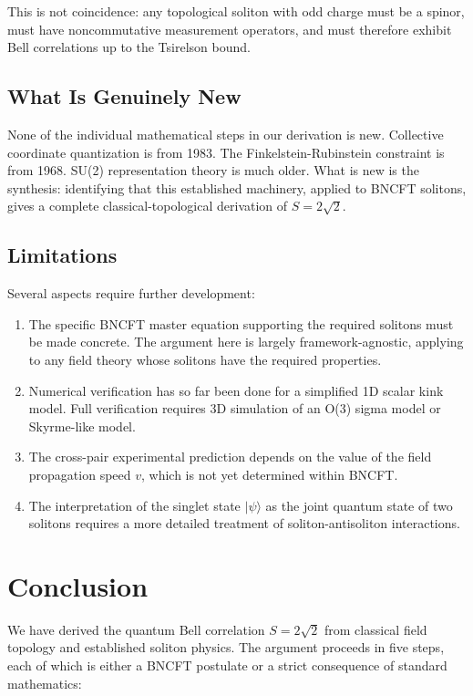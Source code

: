 \documentclass[11pt,a4paper]{article}
\begin{document}
This is not coincidence: any topological soliton with odd charge must be a spinor, must have noncommutative measurement operators, and must therefore exhibit Bell correlations up to the Tsirelson bound.

\subsection{What Is Genuinely New}

None of the individual mathematical steps in our derivation is new. Collective coordinate quantization is from 1983. The Finkelstein-Rubinstein constraint is from 1968. SU(2) representation theory is much older. What is new is the synthesis: identifying that this established machinery, applied to BNCFT solitons, gives a complete classical-topological derivation of $S = 2\sqrt{2}$.

\subsection{Limitations}

Several aspects require further development:
\begin{enumerate}
\item The specific BNCFT master equation supporting the required solitons must be made concrete. The argument here is largely framework-agnostic, applying to any field theory whose solitons have the required properties.
\item Numerical verification has so far been done for a simplified 1D scalar kink model. Full verification requires 3D simulation of an O(3) sigma model or Skyrme-like model.
\item The cross-pair experimental prediction depends on the value of the field propagation speed $v$, which is not yet determined within BNCFT.
\item The interpretation of the singlet state $|\psi\rangle$ as the joint quantum state of two solitons requires a more detailed treatment of soliton-antisoliton interactions.
\end{enumerate}

\section{Conclusion}

We have derived the quantum Bell correlation $S = 2\sqrt{2}$ from classical field topology and established soliton physics. The argument proceeds in five steps, each of which is either a BNCFT postulate or a strict consequence of standard mathematics:
\end{document}
